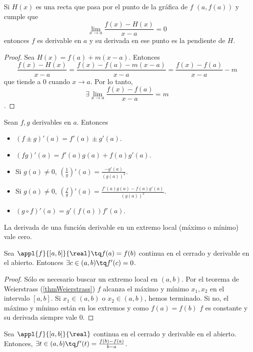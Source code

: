 \documentclass[nochap]{apuntes}
\begin{document}
\begin{prop}
Si $H(x)$ es una recta que pasa por el punto de la gráfica de $f$ $(a, f(a))$ y cumple que \[\lim_{x\to a} \frac{f(x)-H(x)}{x-a}=0\] entonces $f$ es derivable en $a$ y su derivada en ese punto es la pendiente de $H$.\end{prop}

\begin{proof}
Sea $H(x)= f(a)+m(x-a)$. Entonces \[ \frac{f(x)-H(x)}{x-a}=\frac{f(x)-f(a)-m(x-a)}{x-a}=\frac{f(x)-f(a)}{x-a}-m\] que tiende a 0 cuando $x\to a$. Por lo tanto, \[\exists \lim_{x\to a}\frac{f(x)-f(a)}{x-a}=m\].
\end{proof}

\begin{prop}
Sean $f, g$ derivables en $a$. Entonces
\begin{itemize}
\item $(f\pm g)'(a)=f'(a)\pm g'(a)$.
\item $(fg)'(a)=f'(a)g(a)+f(a)g'(a)$.
\item Si $g(a)\neq 0 $, $\left(\frac{1}{g}\right)'(a)=\frac{-g'(a)}{(g(a))^2}$.
\item Si $g(a)\neq 0$, $\left(\frac{f}{g}\right)'(a)=\frac{f'(a)g(a)-f(a)g'(a)}{(g(a))^2}$.
\item $(g\circ f)'(a)= g'(f(a))f'(a)$.
\end{itemize}
\end{prop}

\begin{prop}La derivada de una función derivable en un extremo local (máximo o mínimo) vale cero.\end{prop}

\begin{theorem}
Sea $\appl{f}{[a,b]}{\real} \tq f(a)=f(b)$ continua en el cerrado y derivable en el abierto. Entonces $\exists c \in (a,b) \tq f'(c)=0$.
\end{theorem}

\begin{proof}
Sólo es necesario buscar un extremo local en $(a,b)$. Por el teorema de Weierstrass (\ref{thmWeierstrass}) $f$ alcanza el máximo y mínimo $x_1, x_2$ en el intervalo $[a,b]$. Si $x_1\in (a,b)$ o $x_2 \in (a,b)$, hemos terminado. Si no, el máximo y mínimo están en los extremos y como $f(a)=f(b)$ $f$ es constante y su derivada siempre vale 0.
\end{proof}

\begin{theorem}
Sea $\appl{f}{[a,b]}{\real}$ continua en el cerrado y derivable en el abierto. Entonces, $\exists t \in (a,b) \tq f'(t)=\frac{f(b)-f(a)}{b-a}$.
\end{theorem}
\end{document}
